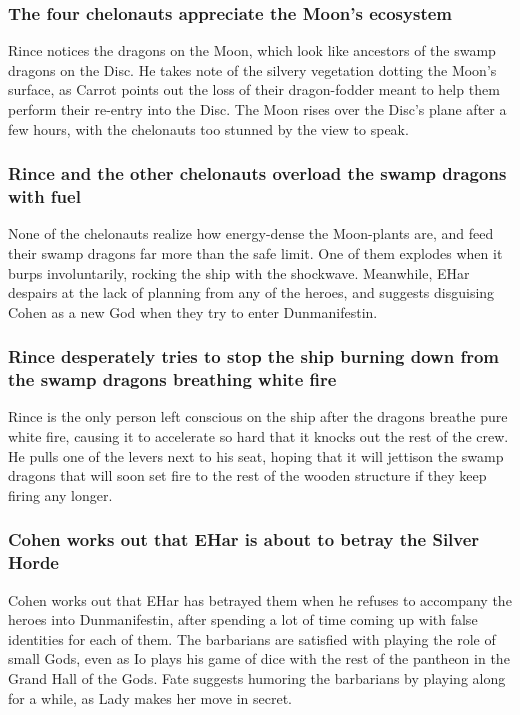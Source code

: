 \subsubsection{The four chelonauts appreciate the Moon's ecosystem}
\Gls{Rince} notices the dragons on the Moon, which look like ancestors of the swamp dragons on the
Disc. He takes note of the silvery vegetation dotting the Moon's surface, as \Gls{Carrot} points
out the loss of their dragon-fodder meant to help them perform their re-entry into the Disc. The
Moon rises over the Disc's plane after a few hours, with the chelonauts too stunned by the view to
speak.

\subsubsection{\Gls{Rince} and the other chelonauts overload the swamp dragons with fuel}
None of the chelonauts realize how energy-dense the Moon-plants are, and feed their swamp dragons
far more than the safe limit. One of them explodes when it burps involuntarily, rocking the ship
with the shockwave. Meanwhile, \Gls{EHar} despairs at the lack of planning from any of the heroes,
and suggests disguising \Gls{Cohen} as a new God when they try to enter Dunmanifestin.

\subsubsection{\Gls{Rince} desperately tries to stop the ship burning down from the swamp dragons
    breathing white fire}
\Gls{Rince} is the only person left conscious on the ship after the dragons breathe pure white
fire, causing it to accelerate so hard that it knocks out the rest of the crew. He pulls one of the
levers next to his seat, hoping that it will jettison the swamp dragons that will soon set fire to
the rest of the wooden structure if they keep firing any longer.

\subsubsection{\Gls{Cohen} works out that \Gls{EHar} is about to betray the Silver Horde}
\Gls{Cohen} works out that \Gls{EHar} has betrayed them when he refuses to accompany the heroes
into Dunmanifestin, after spending a lot of time coming up with false identities for each of them.
The barbarians are satisfied with playing the role of small Gods, even as \Gls{Io} plays his game of
dice with the rest of the pantheon in the Grand Hall of the Gods. \Gls{Fate} suggests humoring the
barbarians by playing along for a while, as \Gls{Lady} makes her move in secret.

